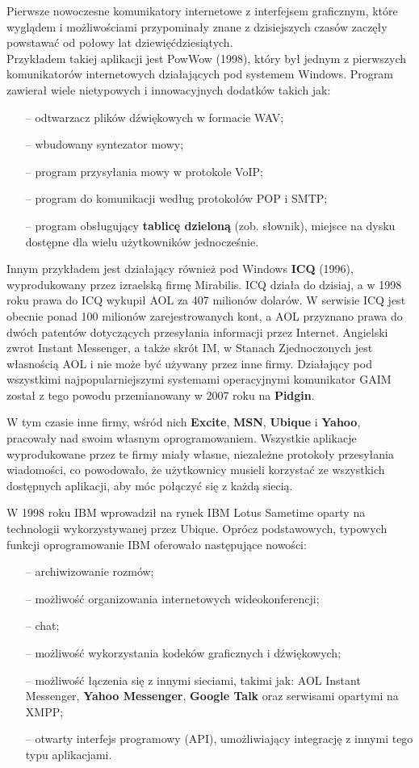 \documentclass[a4paper,12pt]{article}
\begin{document}
\par Pierwsze nowoczesne komunikatory internetowe z interfejsem graficznym, które wyglądem i możliwościami przypominały znane z dzisiejszych czasów zaczęły powstawać od połowy lat dziewięćdziesiątych.\\
Przykładem takiej aplikacji jest PowWow (1998), który był jednym z pierwszych komunikatorów internetowych działających pod systemem Windows. Program zawierał wiele nietypowych i innowacyjnych dodatków takich jak:
\begin{itemize}
    \item[--] odtwarzacz plików dźwiękowych w formacie WAV;
    \item[--] wbudowany syntezator mowy;
    \item[--] program przysyłania mowy w protokole VoIP;
    \item[--] program do komunikacji według protokołów POP i SMTP;
    \item[--] program obsługujący \textbf{tablicę dzieloną} (zob. słownik), miejsce na dysku dostępne dla wielu użytkowników jednocześnie.
\end{itemize}
Innym przykładem jest działający również pod Windows \textbf{ICQ} (1996), wyprodukowany przez izraelską firmę Mirabilis. ICQ działa do dzisiaj, a w 1998 roku prawa do ICQ wykupił AOL za 407 milionów dolarów. W serwisie ICQ jest obecnie ponad 100 milionów zarejestrowanych kont, a AOL przyznano prawa do dwóch patentów dotyczących przesyłania informacji przez Internet. Angielski zwrot Instant Messenger, a także skrót IM, w Stanach Zjednoczonych jest własnością AOL i nie może być używany przez inne firmy. Działający pod wszystkimi najpopularniejszymi systemami operacyjnymi komunikator GAIM został z tego powodu przemianowany w 2007 roku na \textbf{Pidgin}.

W tym czasie inne firmy, wśród nich \textbf{Excite}, \textbf{MSN}, \textbf{Ubique} i \textbf{Yahoo}, pracowały nad swoim własnym oprogramowaniem.
Wszystkie aplikacje wyprodukowane przez te firmy miały własne, niezależne protokoły przesyłania wiadomości, co powodowało, że użytkownicy musieli korzystać ze wszystkich dostępnych aplikacji, aby móc połączyć się z każdą siecią.

\par W 1998 roku IBM wprowadził na rynek IBM Lotus Sametime oparty na technologii wykorzystywanej przez Ubique. Oprócz podstawowych, typowych funkcji oprogramowanie IBM oferowało następujące nowości:
\begin{itemize}
    \item[--] archiwizowanie rozmów;
    \item[--] możliwość organizowania internetowych wideokonferencji;
    \item[--] chat;
    \item[--] możliwość wykorzystania kodeków graficznych i dźwiękowych;
    \item[--] możliwość łączenia się z innymi sieciami, takimi jak: AOL Instant Messenger, \textbf{Yahoo Messenger}, \textbf{Google Talk} oraz serwisami opartymi na XMPP;
    \item[--] otwarty interfejs programowy (API), umożliwiający integrację z innymi tego typu aplikacjami.
\end{itemize}
\end{document}
